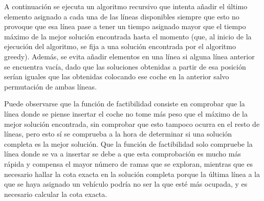 A continuación se ejecuta un algoritmo recursivo que intenta añadir el último elemento asignado a cada una de las líneas disponibles siempre que esto no provoque que esa línea pase a tener un tiempo asignado mayor que el tiempo máximo de la mejor solución encontrada hasta el momento (que, al inicio de la ejecución del algoritmo, se fija a una solución encontrada por el algoritmo greedy). Además, se evita añadir elementos en una línea si alguna línea anterior se encuentra vacía, dado que las soluciones obtenidas a partir de esa posición serían iguales que las obtenidas colocando ese coche en la anterior salvo permutación de ambas líneas.


Puede observarse que la función de factibilidad consiste en comprobar que la línea donde se piense insertar el coche no tome más peso que el máximo de la mejor solución encontrada, sin comprobar que esto tampoco ocurra en el resto de líneas, pero esto sí se comprueba a la hora de determinar si una solución completa es la mejor solución. Que la función de factibilidad solo compruebe la línea donde se va a insertar se debe a que esta comprobación es mucho más rápida y compensa el mayor número de ramas que se exploran, mientras que es necesario hallar la cota exacta en la solución completa porque la última línea a la que se haya asignado un vehículo podría no ser la que esté más ocupada, y es necesario calcular la cota exacta.




